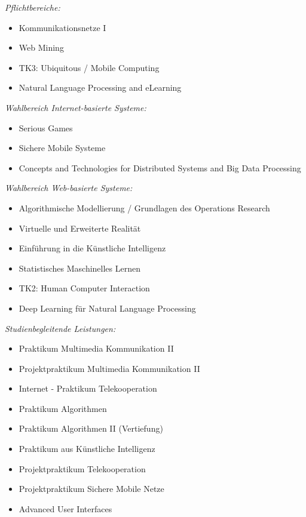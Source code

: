 {    \textit{Pflichtbereiche:}
    \begin{itemize}[noitemsep]
        \item Kommunikationsnetze I
        \item Web Mining
        \item TK3: Ubiquitous / Mobile Computing
        \item Natural Language Processing and eLearning
    \end{itemize}
    \textit{Wahlbereich Internet-basierte Systeme:}
    \begin{itemize}[noitemsep]
        \item Serious Games
        \item Sichere Mobile Systeme
        \item Concepts and Technologies for Distributed Systems and Big Data Processing
    \end{itemize}
    \textit{Wahlbereich Web-basierte Systeme:}
    \begin{itemize}[noitemsep]
        \item Algorithmische Modellierung / Grundlagen des Operations Research
        \item Virtuelle und Erweiterte Realität
        \item Einführung in die Künstliche Intelligenz
        \item Statistisches Maschinelles Lernen
        \item TK2: Human Computer Interaction
        \item Deep Learning für Natural Language Processing
    \end{itemize}
    \textit{Studienbegleitende Leistungen:}
    \begin{itemize}[noitemsep]
        \item Praktikum Multimedia Kommunikation II
        \item Projektpraktikum Multimedia Kommunikation II
        \item Internet - Praktikum Telekooperation
        \item Praktikum Algorithmen
        \item Praktikum Algorithmen II (Vertiefung)
        \item Praktikum aus Künstliche Intelligenz
        \item Projektpraktikum Telekooperation
        \item Projektpraktikum Sichere Mobile Netze
        \item Advanced User Interfaces

\end{itemize}}
